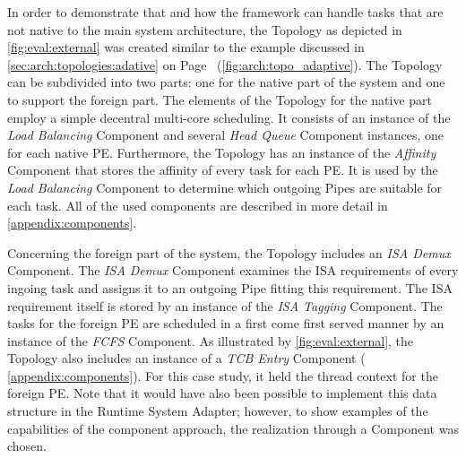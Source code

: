 In order to demonstrate that and how the \cobas{} framework can handle tasks that are not native to the main system architecture, the Topology as depicted in \cref{fig:eval:external} was created similar to the example discussed in \cref{sec:arch:topologies:adative} on Page~\pageref{fig:arch:topo_adaptive} (\cref{fig:arch:topo_adaptive}). The Topology can be subdivided into two parts: one for the native part of the system and one to support the foreign part. The elements of the Topology for the native part employ a simple decentral multi-core scheduling. It consists of an instance of the \emph{Load Balancing} Component  and several \emph{Head Queue} Component instances, one for each native \ac{PE}. Furthermore, the Topology has an instance of the \emph{Affinity} Component that stores the affinity of every task for each \ac{PE}. It is used by the \emph{Load Balancing} Component to determine which outgoing Pipes are suitable for each task. All of the used components are described in more detail in \cref{appendix:components}.

Concerning the foreign part of the system, the Topology includes an \emph{ISA Demux} Component. The \emph{ISA Demux} Component examines the \ac{ISA} requirements of every ingoing task and assigns it to an outgoing Pipe fitting this requirement. The \ac{ISA} requirement itself is stored by an instance of the \emph{ISA Tagging} Component. The tasks for the foreign \ac{PE} are scheduled in a first come first served manner by an instance of the \emph{FCFS} Component. As illustrated by \cref{fig:eval:external}, the Topology also includes an instance of a \emph{TCB Entry} Component (\cf{} \cref{appendix:components}). For this case study, it held the thread context for the foreign \ac{PE}. Note that it would have also been possible to implement this data structure in the Runtime System Adapter; however, to show examples of the capabilities of the component approach, the realization through a \cobas{} Component was chosen.

